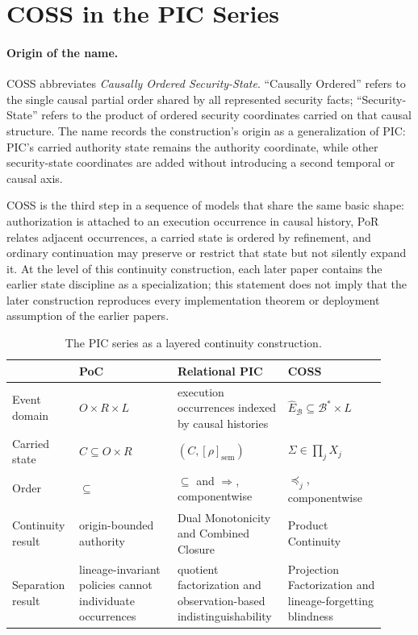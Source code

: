 \documentclass[10pt,twocolumn]{article}
\newcommand{\Model}{\textnormal{\textsc{COSS}}\xspace}
\newcommand{\state}{\Sigma}
\begin{document}
\section{COSS in the PIC Series}
\label{sec:series}

\paragraph{Origin of the name.}
\Model abbreviates \emph{Causally Ordered Security-State}.  ``Causally
Ordered'' refers to the single causal partial order shared by all represented
security facts; ``Security-State'' refers to the product of ordered security
coordinates carried on that causal structure.  The name records the
construction's origin as a generalization of PIC: PIC's carried authority state
remains the authority coordinate, while other security-state coordinates are
added without introducing a second temporal or causal axis.

\Model is the third step in a sequence of models that share the same basic
shape: authorization is attached to an execution occurrence in causal history,
PoR relates adjacent occurrences, a carried state is ordered by refinement, and
ordinary continuation may preserve or restrict that state but not silently
expand it.  At the level of this continuity construction, each later paper
contains the earlier state discipline as a specialization; this statement does
not imply that the later construction reproduces every implementation theorem
or deployment assumption of the earlier papers.

\begin{table}[t]
\centering
\small
\begin{tabular}{@{}p{0.15\linewidth}p{0.255\linewidth}p{0.255\linewidth}p{0.255\linewidth}@{}}
\toprule
 & PoC \cite{gallo_poc2026} & Relational PIC \cite{gallo_relational2026} & \Model \\
\midrule
Event domain & $O\times R\times L$ & execution occurrences indexed by causal histories & $\widehat E_{\mathcal B}\subseteq\mathcal{B}^*\times L$ \\
Carried state & $C\subseteq O\times R$ & $(C,[\rho]_{\mathrm{sem}})$ & $\state\in\prod_j X_j$ \\
Order & $\subseteq$ & $\subseteq$ and $\Rightarrow$, componentwise & $\preceq_j$, componentwise \\
Continuity result & origin-bounded authority & Dual Monotonicity and Combined Closure & Product Continuity \\
Separation result & lineage-invariant policies cannot individuate occurrences & quotient factorization and observation-based indistinguishability & Projection Factorization and lineage-forgetting blindness \\
\bottomrule
\end{tabular}
\caption{The PIC series as a layered continuity construction.}
\label{tab:series}
\end{table}
\end{document}
